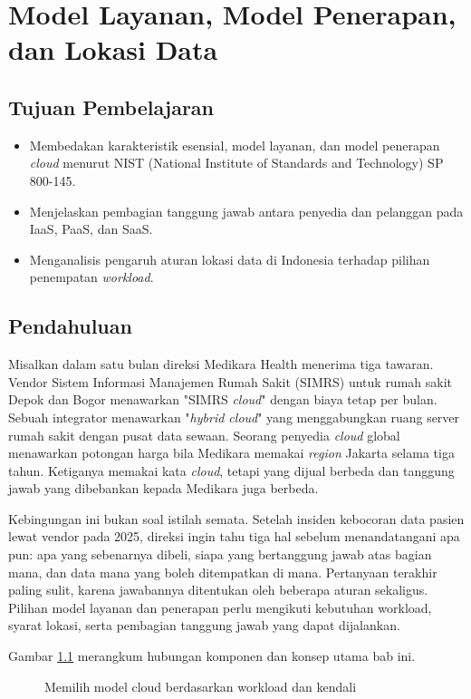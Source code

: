\chapter{Model Layanan, Model Penerapan, dan Lokasi Data}

\section*{Tujuan Pembelajaran}
\begin{itemize}
  \item Membedakan karakteristik esensial, model layanan, dan model penerapan \textit{cloud} menurut NIST (National Institute of Standards and Technology) SP 800-145.
  \item Menjelaskan pembagian tanggung jawab antara penyedia dan pelanggan pada IaaS, PaaS, dan SaaS.
  \item Menganalisis pengaruh aturan lokasi data di Indonesia terhadap pilihan penempatan \textit{workload}.
\end{itemize}

\section{Pendahuluan}

Misalkan dalam satu bulan direksi Medikara Health menerima tiga tawaran. Vendor Sistem
Informasi Manajemen Rumah Sakit (SIMRS) untuk rumah sakit Depok dan Bogor menawarkan "SIMRS
\textit{cloud}" dengan biaya tetap per bulan. Sebuah integrator menawarkan "\textit{hybrid
cloud}" yang menggabungkan ruang server rumah sakit dengan pusat data sewaan. Seorang
penyedia \textit{cloud} global menawarkan potongan harga bila Medikara memakai
\textit{region} Jakarta selama tiga tahun. Ketiganya memakai kata \textit{cloud}, tetapi
yang dijual berbeda dan tanggung jawab yang dibebankan kepada Medikara juga berbeda.

Kebingungan ini bukan soal istilah semata. Setelah insiden kebocoran data pasien lewat
vendor pada 2025, direksi ingin tahu tiga hal sebelum menandatangani apa pun: apa yang
sebenarnya dibeli, siapa yang bertanggung jawab atas bagian mana, dan data mana yang boleh
ditempatkan di mana. Pertanyaan terakhir paling sulit, karena jawabannya ditentukan oleh
beberapa aturan sekaligus. Pilihan model layanan dan penerapan perlu mengikuti kebutuhan workload,
syarat lokasi, serta pembagian tanggung jawab yang dapat dijalankan.

Gambar \ref{fig:ch02-ilustrasi} merangkum hubungan komponen dan konsep utama bab ini.
\begin{figure}[!htb]
  \centering
  
  \caption{Memilih model cloud berdasarkan workload dan kendali}
  \label{fig:ch02-ilustrasi}
\end{figure}

